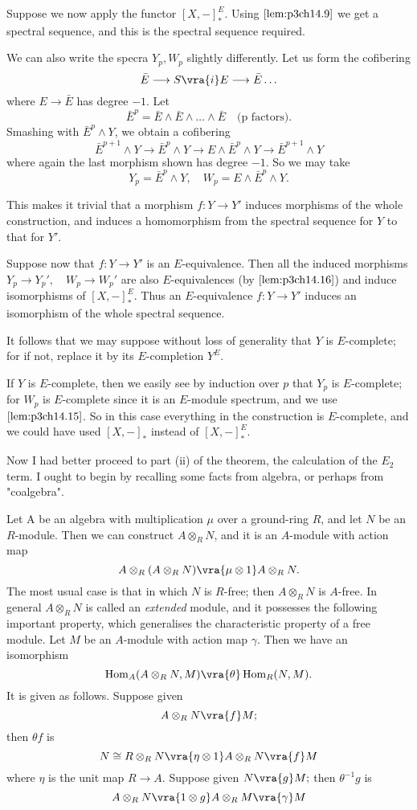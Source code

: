\documentclass[../main]{subfiles}
\begin{document}
\par Suppose we now apply the functor $[X,-]_\ast^E$. Using $\ref{lem:p3ch14.9}$ we get a spectral sequence, and this is the spectral sequence required.

We can also write the specra $Y_p, W_p$ slightly differently. Let us form the cofibering
\[\bar{E}\longrightarrow S \vra{i}E\longrightarrow\bar{E}\hdots\]
where $E\longrightarrow\bar{E}$ has degree $-1$. Let
\[\bar{E}^p=\bar{E}\wedge\bar{E}\wedge\hdots\wedge\bar{E} \quad \text{(p factors).}\]
Smashing with $\bar{E}^p\wedge Y$, we obtain a cofibering
\[\bar{E}^{p+1}\wedge Y\longrightarrow \bar{E}^p\wedge Y \longrightarrow E\wedge \bar{E}^p\wedge Y \longrightarrow \bar{E}^{p+1}\wedge Y\]
where again the last morphism shown has degree $-1$. So we may take 
\[Y_p=\bar{E}^p\wedge Y, \quad W_p=E\wedge\bar{E}^p\wedge Y.\]

This makes it trivial that a morphism $f:Y\longrightarrow Y'$ induces morphisms of the whole construction, and induces a homomorphism from the spectral sequence for $Y$ to that for $Y'$.

Suppose now that $f:Y\longrightarrow Y'$ is an $E$-equivalence. Then all the induced morphisms $Y_p\longrightarrow Y_p',\quad W_p\longrightarrow W_p'$ are also $E$-equivalences (by $\ref{lem:p3ch14.16}$) and induce isomorphisms of $[X,-]_\ast^E$. Thus an $E$-equivalence $f:Y\longrightarrow Y'$ induces an isomorphism of the whole spectral sequence.

It follows that we may suppose without loss of generality that $Y$ is $E$-complete; for if not, replace it by its $E$-completion $Y^E$.

If $Y$ is $E$-complete, then we easily see by induction over $p$ that $Y_p$ is $E$-complete; for $W_p$ is $E$-complete since it is an $E$-module spectrum, and we use $\ref{lem:p3ch14.15}$. So in this case everything in the construction is $E$-complete, and we could have used $[X,-]_\ast$ instead of $[X,-]_\ast^E$.

\par Now I had better proceed to part (ii) of the theorem, the calculation of the $E_2$ term. I ought to begin by recalling some facts from algebra, or perhaps from "coalgebra".

\par Let A be an algebra with multiplication $\mu$ over a ground-ring $R$, and let $N$ be an $R$-module. Then we can construct $A\otimes_R N$, and it is an $A$-module with action map 
\[A\otimes_R(A\otimes_R N)\vra{\mu\otimes 1} A\otimes_R N.\]
The most usual case is that in which $N$ is $R$-free; then $A\otimes_R N$ is $A$-free. In general $A\otimes_R N$ is called an \emph{extended} module, and it possesses the following important property, which generalises the characteristic property of a free module. Let $M$ be an $A$-module with action map $\gamma$. Then we have an isomorphism
\[\operatorname{Hom}_A(A\otimes_R N, M)\vra{\theta}\operatorname{Hom}_R(N,M).\]
It is given as follows. Suppose given
\[A\otimes_R N\vra{f} M;\]
then $\theta f$ is
\[N\cong R\otimes_R N\vra{\eta\otimes 1} A\otimes_R N\vra{f}M\]
where $\eta$ is the unit map $R\longrightarrow A$. Suppose given $N\vra{g} M;$ then $\theta^{-1}g$ is
\[A\otimes_R N\vra{1\otimes g} A\otimes_R M\vra{\gamma} M\]
\end{document}
